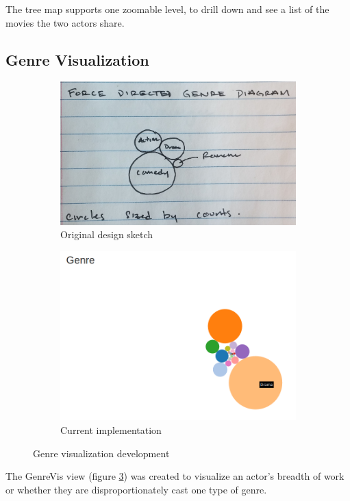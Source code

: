 \documentclass[12pt]{article}
\begin{document}
The tree map supports one zoomable level, to drill down and see a list of the movies the two actors share.
\newpage

\subsection{Genre Visualization}

	\begin{figure}[h!]
		\centering
		\begin{subfigure}[t]{.5\textwidth}
		  \centering
		  \includegraphics[width=\linewidth]{images/genreVis_crop.png}
		  \caption{Original design sketch}
		  \label{fig:sub1}
		\end{subfigure}%
		\begin{subfigure}[t]{.8\textwidth}
		  \centering
		  \includegraphics[width=.7\linewidth]{images/genreVis.png}
		  \caption{Current implementation}
		  \label{fig:sub2}
		\end{subfigure}%
		\caption{Genre visualization development}
		\label{fig:genreVis}
	\end{figure}

	
The GenreVis view (figure \ref{fig:genreVis}) was created to visualize an actor's breadth of work or whether they are disproportionately cast one type of genre.  
\end{document}

